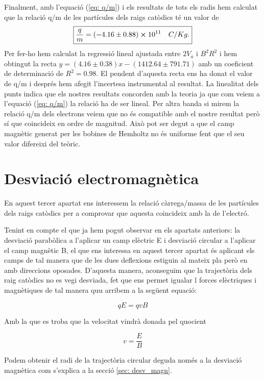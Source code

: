 \documentclass[11pt]{article}
\begin{document}
Finalment, amb l'equació (\ref{eq: q/m}) i els resultats de tots els radis hem calculat que la relació q/m de les partícules dels raigs catòdics té un valor de 
\[
\boxed{\frac{q}{m}=(-4.16\pm0.88)\cross10^{11}\quad C/Kg.}
\]
Per fer-ho hem calculat la regressió lineal ajustada entre $2V_a$ i $B^2R^2$ i hem obtingut la recta $y=(4.16\pm0.38)x - (1412.64\pm791.71)$ amb un coeficient de determinació de $R^2=0.98$. El pendent d'aquesta recta ens ha donat el valor de q/m i després hem afegit l'incertesa instrumental al resultat. La linealitat dels punts indica que els nostres resultats concorden amb la teoria ja que com veiem a l'equació (\ref{eq: q/m}) la relació ha de ser lineal. Per altra banda si mirem la relació q/m dels electrons veiem que no és compatible amb el nostre resultat però sí que coincideix en ordre de magnitud. Això pot ser degut a que el camp magnètic generat per les bobines de Hemholtz no és uniforme fent que el seu valor difereixi del teòric.


\section{Desviació electromagnètica}\label{sec: desv_em}

En aquest tercer apartat ens interessem la relació càrrega/massa de les partícules dels raigs catòdics per a comprovar que aquesta coincideix amb la de l'electró. 

Tenint en compte el que ja hem pogut observar en els apartats anteriors: la desviació parabòlica a l'aplicar un camp elèctric E i desviació circular a l'aplicar el camp magnètic B, el que ens interessa en aquest tercer apartat és aplicant els camps de tal manera que de les dues deflexions estiguin al mateix pla però en amb direccions oposades. D'aquesta manera, aconseguim que la trajectòria dels raig catòdics no es vegi desviada, fet que ens permet igualar l forces elèctriques i magnètiques de tal manera quu arribem a la següent equació:

\begin{equation}\label{eq: Fm=Fe}
    qE = qvB
\end{equation}

Amb la que es troba que la velocitat vindrà donada pel quocient

\begin{equation}
    v = \frac{E}{B}
\end{equation}

Podem obtenir el radi de la trajectòria circular deguda només a la desviació magnètica com s'explica a la secció \ref{sec: desv_magn}.
\end{document}
